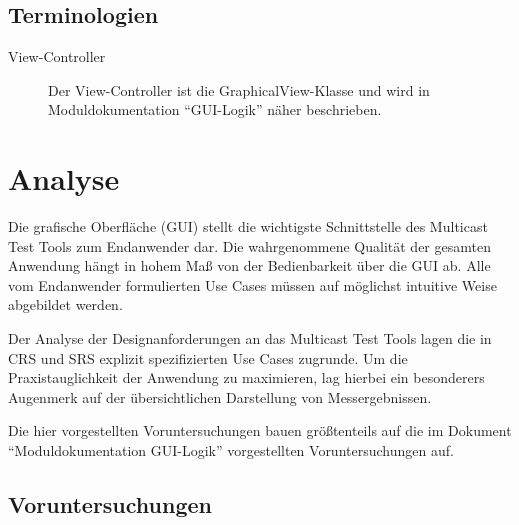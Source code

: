 

\section{Terminologien}
    
    \begin{description}
        \item[View-Controller] Der View-Controller ist die GraphicalView-Klasse
        und wird in Moduldokumentation "`GUI-Logik"' näher beschrieben.
    \end{description}


\chapter{Analyse}

    Die grafische Oberfläche (GUI) stellt die wichtigste Schnittstelle des
    Multicast Test Tools zum Endanwender dar. Die wahrgenommene Qualität der
    gesamten Anwendung hängt in hohem Maß von der Bedienbarkeit über die GUI ab.
    Alle vom Endanwender formulierten Use Cases müssen auf möglichst intuitive
    Weise abgebildet werden.
    
    Der Analyse der Designanforderungen an das Multicast Test Tools lagen die in
    CRS und SRS explizit spezifizierten Use Cases zugrunde. Um die
    Praxistauglichkeit der Anwendung zu maximieren, lag hierbei ein besonderers
    Augenmerk auf der übersichtlichen Darstellung von Messergebnissen.
    
    Die hier vorgestellten Voruntersuchungen bauen größtenteils auf die
    im Dokument ``Moduldokumentation GUI-Logik'' vorgestellten Voruntersuchungen
    auf.

    \section{Voruntersuchungen}
        
